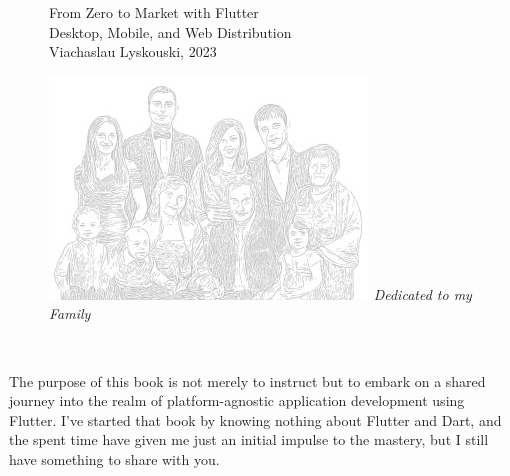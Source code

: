 
\thispagestyle{empty}

\begin{figure}
  \begin{minipage}{0.59\textwidth}
    \large From Zero to Market with Flutter\\
    \vspace{9mm}
    \noindent \small Desktop, Mobile, and Web Distribution\\
    \vspace{10mm}
    Viachaslau Lyskouski, 2023\\
    \vspace{2mm}
  \end{minipage}
  \hfill
  \begin{minipage}{0.31\textwidth}
    \includegraphics[width=\textwidth]{_cover/to.jpg}
    \emph{Dedicated to my Family}\\
  \end{minipage}
\end{figure}
~
\vspace{2cm}

\noindent The purpose of this book is not merely to instruct but to embark on a shared journey into the realm of 
platform-agnostic application development using Flutter. I've started that book by knowing nothing about Flutter and 
Dart, and the spent time have given me just an initial impulse to the mastery, but I still have something to share with 
you. 

\vspace{3mm}


